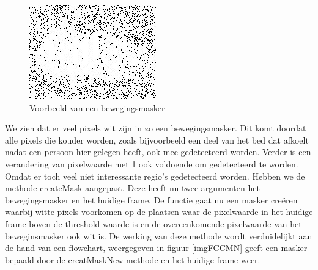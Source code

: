 \begin{figure}[hbp]
	\includegraphics[scale=0.75]{bewegingsMatrix}
	\caption{Voorbeeld van een bewegingsmasker}
	\label{imgBMa}
\end{figure}
We zien dat er veel pixels wit zijn in zo een bewegingsmasker. Dit komt doordat alle pixels die kouder worden, zoals bijvoorbeeld een deel van het bed dat afkoelt nadat een persoon hier gelegen heeft, ook mee gedetecteerd worden. Verder is een verandering van pixelwaarde met 1 ook voldoende om gedetecteerd te worden. Omdat er toch veel niet interessante regio's gedetecteerd worden. Hebben we de methode createMask aangepast. Deze heeft nu twee argumenten het bewegingsmasker en het huidige frame. De functie gaat nu een masker cre\"eren waarbij witte pixels voorkomen op de plaatsen waar de pixelwaarde in het huidige frame boven de threshold waarde is en de overeenkomende pixelwaarde van het beweginsmasker ook wit is. De werking van deze methode wordt verduidelijkt aan de hand van een flowchart, weergegeven in figuur \ref{imgFCCMN} geeft een masker bepaald door de creatMaskNew methode en het huidige frame weer.
